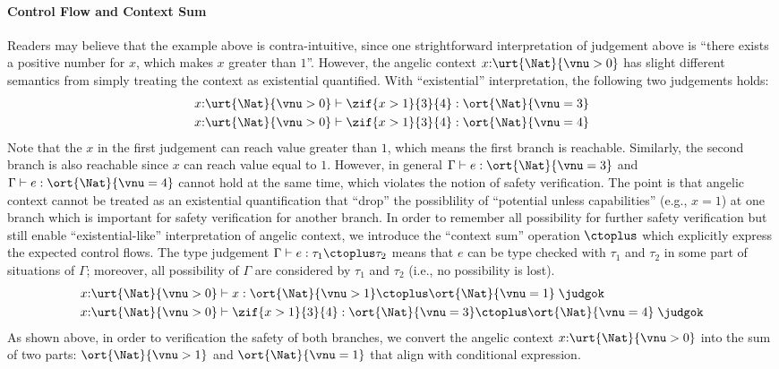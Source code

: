 \paragraph{Control Flow and Context Sum} Readers may believe that the example above is contra-intuitive, since one strightforward interpretation of judgement above is ``there exists a positive number for $x$, which makes $x$ greater than $1$''. However, the angelic context $x{:}\urt{\Nat}{\vnu > 0}$ has slight different semantics from simply treating the context as existential quantified. 
With ``existential'' interpretation, the following two judgements holds:
\begin{align*}
  &x{:}\urt{\Nat}{\vnu > 0} \vdash \zif{x > 1}{3}{4} : \ort{\Nat}{\vnu = 3}
  \\&x{:}\urt{\Nat}{\vnu > 0} \vdash \zif{x > 1}{3}{4} : \ort{\Nat}{\vnu = 4}
\end{align*}\noindent
Note that the $x$ in the first judgement can reach value greater than $1$, which means the first branch is reachable. Similarly, the second branch is also reachable since $x$ can reach value equal to $1$. However, in general $\Gamma \vdash e : \ort{\Nat}{\vnu = 3}$ and $\Gamma \vdash e : \ort{\Nat}{\vnu = 4}$ cannot hold at the same time, which violates the notion of safety verification. The point is that angelic context cannot be treated as an existential quantification that ``drop'' the possiblility of ``potential unless capabilities'' (e.g., $x = 1$) at one branch which is important for safety verification for another branch. In order to remember all possibility for further safety verification but still enable ``existential-like'' interpretation of angelic context, we introduce the ``context sum'' operation $\ctoplus$ which explicitly express the expected control flows. The type judgement $\Gamma \vdash e : \tau_1 \ctoplus \tau_2$ means that $e$ can be type checked with $\tau_1$ and $\tau_2$ in some part of situations of $\Gamma$; moreover, all possibility of $\Gamma$ are considered by $\tau_1$ and $\tau_2$ (i.e., no possibility is lost). 
\begin{align*}
  &x{:}\urt{\Nat}{\vnu > 0} \vdash x : \ort{\Nat}{\vnu > 1}\ctoplus \ort{\Nat}{\vnu = 1} \;\judgok
  \\&x{:}\urt{\Nat}{\vnu > 0} \vdash \zif{x > 1}{3}{4} : \ort{\Nat}{\vnu = 3}\ctoplus \ort{\Nat}{\vnu = 4} \;\judgok
\end{align*}\noindent
As shown above, in order to verification the safety of both branches, we convert the angelic context $x{:}\urt{\Nat}{\vnu > 0}$ into the sum of two parts: $\ort{\Nat}{\vnu > 1}$ and $\ort{\Nat}{\vnu = 1}$ that align with conditional expression.

